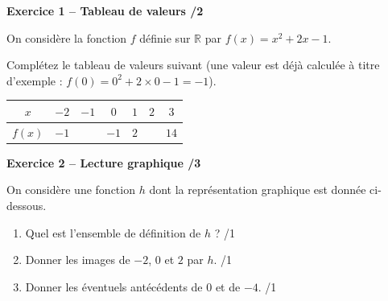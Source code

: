 \documentclass[10pt,a4paper]{article}
\begin{document}
\newpage



\textbf{Exercice 1 -- Tableau de valeurs \hfill /2}

On considère la fonction \(f\) définie sur \(\mathbb{R}\) par \(f(x)=x^2+2x-1\).

Complétez le tableau de valeurs suivant (une valeur est déjà calculée à titre d'exemple : \(f(0)=0^2+2\times 0-1=-1\)).

\begin{center}
    \renewcommand{\arraystretch}{1.5}
    \setlength{\tabcolsep}{0.25cm}
    \begin{tabular}{|*{7}{c|}}
    \hline
    \(x\) & \(-2\) & \(-1\) & \(0\) & \(1\) & \(2\) & \(3\) \\
    \hline
    \(f(x)\) & \(-1\) & & \(-1\) & \(2\) & & \(14\) \\
    \hline
    \end{tabular}
\end{center}

\vspace{3cm}

\textbf{Exercice 2 -- Lecture graphique \hfill /3}

On considère une fonction \(h\) dont la représentation graphique est donnée ci-dessous.

\begin{center}
\end{center}

\begin{enumerate}
    \item Quel est l'ensemble de définition de \(h\) ? \hfill /1
    \item Donner les images de \(-2\), \(0\) et \(2\) par \(h\). \hfill /1
    \item Donner les éventuels antécédents de \(0\) et de \(-4\). \hfill /1
\end{enumerate}
\end{document}
